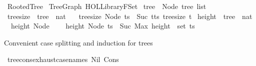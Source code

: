 %
\begin{isabellebody}%
%
%
\isadelimtheory
%
\endisadelimtheory
%
\isatagtheory
{}\isamarkupfalse%
\ Rooted{\isacharunderscore}{\kern0pt}Tree\isanewline
{}\ Tree{\isacharunderscore}{\kern0pt}Graph\ {\isachardoublequoteopen}HOL{\isacharminus}{\kern0pt}Library{\isachardot}{\kern0pt}FSet{\isachardoublequoteclose}\isanewline
{}%
\endisatagtheory
{\isafoldtheory}%
%
\isadelimtheory
\isanewline
%
\endisadelimtheory
\isanewline
{}\isamarkupfalse%
\ tree\ {\isacharequal}{\kern0pt}\ Node\ {\isachardoublequoteopen}tree\ list{\isachardoublequoteclose}\isanewline
\isanewline
{}\isamarkupfalse%
\ tree{\isacharunderscore}{\kern0pt}size\ {\isacharcolon}{\kern0pt}{\isacharcolon}{\kern0pt}\ {\isachardoublequoteopen}tree\ {\isasymRightarrow}\ nat{\isachardoublequoteclose}\ \isanewline
\ \ {\isachardoublequoteopen}tree{\isacharunderscore}{\kern0pt}size\ {\isacharparenleft}{\kern0pt}Node\ ts{\isacharparenright}{\kern0pt}\ {\isacharequal}{\kern0pt}\ Suc\ {\isacharparenleft}{\kern0pt}{\isasymSum}t{\isasymleftarrow}ts{\isachardot}{\kern0pt}\ tree{\isacharunderscore}{\kern0pt}size\ t{\isacharparenright}{\kern0pt}{\isachardoublequoteclose}\isanewline
\isanewline
{}\isamarkupfalse%
\ height\ {\isacharcolon}{\kern0pt}{\isacharcolon}{\kern0pt}\ {\isachardoublequoteopen}tree\ {\isasymRightarrow}\ nat{\isachardoublequoteclose}\ \isanewline
\ \ {\isachardoublequoteopen}height\ {\isacharparenleft}{\kern0pt}Node\ {\isacharbrackleft}{\kern0pt}{\isacharbrackright}{\kern0pt}{\isacharparenright}{\kern0pt}\ {\isacharequal}{\kern0pt}\ {}{\isachardoublequoteclose}\isanewline
{\isacharbar}{\kern0pt}\ {\isachardoublequoteopen}height\ {\isacharparenleft}{\kern0pt}Node\ ts{\isacharparenright}{\kern0pt}\ {\isacharequal}{\kern0pt}\ Suc\ {\isacharparenleft}{\kern0pt}Max\ {\isacharparenleft}{\kern0pt}height\ {\isacharbackquote}{\kern0pt}\ set\ ts{\isacharparenright}{\kern0pt}{\isacharparenright}{\kern0pt}{\isachardoublequoteclose}%
\begin{isamarkuptext}%
Convenient case splitting and induction for trees%
\end{isamarkuptext}\isamarkuptrue%
\isamarkupfalse%
\ tree{\isacharunderscore}{\kern0pt}cons{\isacharunderscore}{\kern0pt}exhaust{\isacharbrackleft}{\kern0pt}case{\isacharunderscore}{\kern0pt}names\ Nil\ Cons{\isacharbrackright}{\kern0pt}{\isacharcolon}{\kern0pt}\isanewline

\end{isabellebody}
